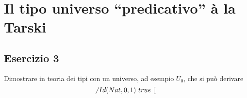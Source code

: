 \section{Il tipo universo ``predicativo'' à la Tarski}
\subsection{Esercizio 3}
\begin{thm}
	Dimostrare in teoria dei tipi con un universo, ad esempio $U_0$, che si può derivare
	\[\not~Id(Nat, 0, 1)~true~[]\]
\end{thm}

